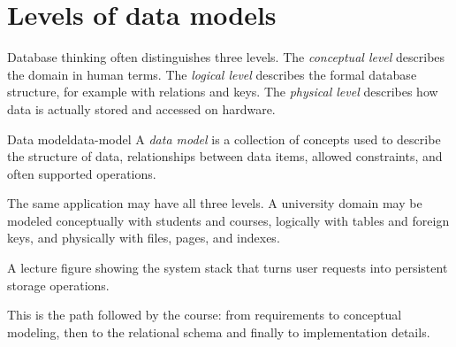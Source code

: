 \documentclass[11pt,a4paper,openany]{book}
\begin{document}
\section{Levels of data models}
Database thinking often distinguishes three levels. The \emph{conceptual level} describes the domain in human terms. The \emph{logical level} describes the formal database structure, for example with relations and keys. The \emph{physical level} describes how data is actually stored and accessed on hardware.

\begin{definition}{Data model}{data-model}
A \emph{data model} is a collection of concepts used to describe the structure of data, relationships between data items, allowed constraints, and often supported operations.
\end{definition}

The same application may have all three levels. A university domain may be modeled conceptually with students and courses, logically with tables and foreign keys, and physically with files, pages, and indexes.



\begin{center}

\small A lecture figure showing the system stack that turns user requests into persistent storage operations.
\end{center}

\begin{center}

\small This is the path followed by the course: from requirements to conceptual modeling, then to the relational schema and finally to implementation details.
\end{center}
\end{document}

